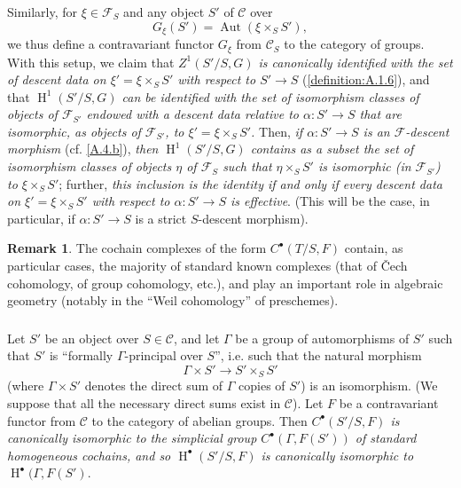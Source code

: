 \documentclass{article}
\theoremstyle{plain}
\theoremstyle{definition}
\newenvironment{example}[1]
  {\renewcommand\theinnercustomexample{#1}\innercustomexample}
  {\endinnercustomexample}
\newtheorem*{remark}{Remark}
\newcommand{\sh}[1]{{\mathscr{#1}}}
\newcommand{\cat}[1]{{\mathcal{#1}}}
\DeclareMathOperator{\Aut}{Aut}
\DeclareMathOperator{\HH}{H}
\newcommand{\oldpage}[1]{\marginpar{\footnotesize$\Big\vert$ \textit{p.~#1}}}
\begin{document}
Similarly, for $\xi\in\sh{F}_S$ and any object $S'$ of $\cat{C}$ over
\[
  G_\xi(S') = \Aut(\xi\times_S S'),
\]
we thus define a contravariant functor $G_\xi$ from $\cat{C}_S$ to the category of
\oldpage{190-14}
groups.
With this setup, we claim that \emph{$Z^1(S'/S,G)$ is canonically identified with the set of descent data on $\xi'=\xi\times_S S'$ with respect to $S'\to S$} (\cref{definition:A.1.6}), and that \emph{$\HH^1(S'/S,G)$ can be identified with the set of isomorphism classes of objects of $\sh{F}_{S'}$ endowed with a descent data relative to $\alpha\colon S'\to S$ that are isomorphic, as objects of $\sh{F}_{S'}$, to $\xi'=\xi\times_S S'$.}
Then, \emph{if $\alpha\colon S'\to S$ is an $\sh{F}$-descent morphism} (cf. \cref{A.4.b}), \emph{then $\HH^1(S'/S,G)$ contains as a subset the set of isomorphism classes of objects $\eta$ of $\sh{F}_S$ such that $\eta\times_S S'$ is isomorphic (in $\sh{F}_{S'}$) to $\xi\times_S S'$};
further, \emph{this inclusion is the identity if and only if every descent data on $\xi'=\xi\times_S S'$ with respect to $\alpha\colon S'\to S$ is effective}.
(This will be the case, in particular, if $\alpha\colon S'\to S$ is a strict $S$-descent morphism).

\begin{remark}
  The cochain complexes of the form $C^\bullet(T/S,F)$ contain, as particular cases, the majority of standard known complexes (that of \v{C}ech cohomology, of group cohomology, etc.), and play an important role in algebraic geometry (notably in the ``Weil cohomology'' of preschemes).
\end{remark}


\subsubsection{}
\label{A.4.d}

\begin{example}{1}
\label{example:A.4.d}
  Let $S'$ be an object over $S\in\cat{C}$, and let $\Gamma$ be a group of automorphisms of $S'$ such that $S'$ is ``formally $\Gamma$-principal over $S$'', i.e. such that the natural morphism
  \[
    \Gamma\times S' \to S'\times_S S'
  \]
  (where $\Gamma\times S'$ denotes the direct sum of $\Gamma$ copies of $S'$) is an isomorphism.
  (We suppose that all the necessary direct sums exist in $\cat{C}$).
  Let $F$ be a contravariant functor from $\cat{C}$ to the category of abelian groups.
  Then \emph{$C^\bullet(S'/S,F)$ is canonically isomorphic to the simplicial group $C^\bullet(\Gamma,F(S'))$ of standard homogeneous cochains, and so $\HH^\bullet(S'/S,F)$ is canonically isomorphic to $\HH^\bullet(\Gamma,F(S')$}.
\end{example}
\end{document}
